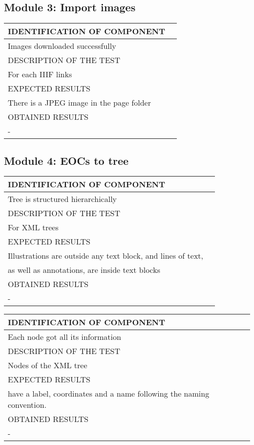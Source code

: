 \documentclass{polytech/polytech}
\numberwithin{figure}{chapter}
\begin{document}
\begin{appendix}
\subsection{Module 3: Import images}

\begin{table}[]
\begin{tabular}{|l|l|}\hline
\color{C} IDENTIFICATION OF COMPONENT \\\hline
Images downloaded successfully  \\\hline
\color{C} DESCRIPTION OF THE TEST\\\hline
For each IIIF links    \\\hline
\color{C} EXPECTED RESULTS \\\hline
There is a JPEG image in the page folder \\\hline
\color{C} OBTAINED RESULTS \\\hline
- \\\hline
\end{tabular}
\end{table}

\subsection{Module 4: EOCs to tree}

\begin{table}[]
\begin{tabular}{|l|l|}\hline
\color{C} IDENTIFICATION OF COMPONENT \\\hline
Tree is structured hierarchically  \\\hline
\color{C} DESCRIPTION OF THE TEST\\\hline
For XML trees    \\\hline
\color{C} EXPECTED RESULTS \\\hline
Illustrations are outside any text block, and lines of text,\\ as well as annotations, are inside text blocks \\\hline
\color{C} OBTAINED RESULTS \\\hline
- \\\hline
\end{tabular}
\end{table}

\begin{table}[]
\begin{tabular}{|l|l|}\hline
\color{C} IDENTIFICATION OF COMPONENT \\\hline
Each node got all its information  \\\hline
\color{C} DESCRIPTION OF THE TEST\\\hline
Nodes of the XML tree     \\\hline
\color{C} EXPECTED RESULTS \\\hline
have a label, coordinates and a name following the naming convention. \\\hline
\color{C} OBTAINED RESULTS \\\hline
- \\\hline
\end{tabular}
\end{table}


\end{appendix}
\end{document}
